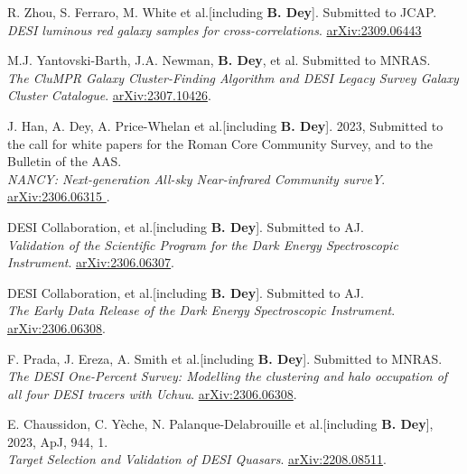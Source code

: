  \begin{etaremune}[leftmargin=40pt,labelsep=10pt]
 \item R. Zhou, S. Ferraro, M. White et al.[including \textbf{B. Dey}]. Submitted to JCAP.\\ \textrm{\textit{DESI luminous red galaxy samples for cross-correlations}}. \href{https://arxiv.org/abs/2309.06443}{arXiv:2309.06443}
 
 \item M.J. Yantovski-Barth, J.A. Newman, \textbf{B. Dey}, et al. Submitted to MNRAS.\\ \textrm{\textit{The CluMPR Galaxy Cluster-Finding Algorithm and DESI Legacy Survey Galaxy Cluster Catalogue}}. \href{https://arxiv.org/abs/2307.10426}{arXiv:2307.10426}.
 
 \item J. Han, A. Dey, A. Price-Whelan et al.[including \textbf{B. Dey}]. 2023, Submitted to the call for white papers for the Roman Core Community Survey, and to the Bulletin of the AAS. \\ \textrm{\textit{NANCY: Next-generation All-sky Near-infrared Community surveY}}. \href{https://arxiv.org/abs/2306.06315}{arXiv:2306.06315 }.

 \item DESI Collaboration, et al.[including \textbf{B. Dey}]. Submitted to AJ.\\ \textrm{\textit{Validation of the Scientific Program for the Dark Energy Spectroscopic Instrument}}. \href{https://arxiv.org/abs/2306.06307}{arXiv:2306.06307}.
 
  \item DESI Collaboration, et al.[including \textbf{B. Dey}]. Submitted to AJ.\\ \textrm{\textit{The Early Data Release of the Dark Energy Spectroscopic Instrument}}. \href{https://arxiv.org/abs/2306.06308}{arXiv:2306.06308}.

 \item F. Prada, J. Ereza, A. Smith et al.[including \textbf{B. Dey}]. Submitted to MNRAS.
 \\ \textrm{\textit{The DESI One-Percent Survey: Modelling the clustering and halo occupation of all four DESI tracers with Uchuu}}. \href{https://arxiv.org/abs/2306.06308}{arXiv:2306.06308}.
 
 \item E. Chaussidon, C. Y\`eche, N. Palanque-Delabrouille et al.[including \textbf{B. Dey}], 2023, ApJ, 944, 1. \\ \textrm{\textit{Target Selection and Validation of DESI Quasars}}. \href{https://arxiv.org/abs/2208.08511}{arXiv:2208.08511}.
 

\end{etaremune}
